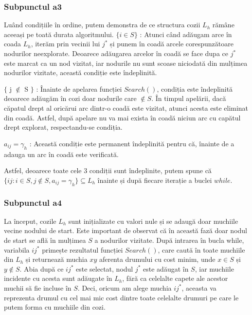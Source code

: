 \documentclass{article}
\begin{document}
\subsubsection*{\fontsize{14}{20}\selectfont Subpunctul a3}
{\fontsize{14}{16}\selectfont
Luând condițiile în ordine, putem demonstra de ce structura cozii $L_h$ rămâne aceeași pe toată durata algoritmului.
$\lbrace i \in S \rbrace$ : Atunci când adăugam arce în coada $L_h$, iterăm prin vecinii lui $j^*$ și punem în coadă arcele corespunzătoare nodurilor neexplorate. Deoarece adăugarea arcelor în coadă se face dupa ce $j^*$ este marcat ca un nod vizitat, iar nodurile nu sunt scoase niciodată din mulțimea nodurilor vizitate, această condiție este îndeplinită.

$\lbrace$ j $\notin$ S $\rbrace$ : Înainte de apelarea funcției $Search()$, condiția este îndeplinită deoarece adăugăm în cozi doar nodurile care $\notin S$. În timpul apelării, dacă căpatul drept al oricărui arc dintr-o coadă este vizitat, atunci acesta este eliminat din coadă. Astfel, după apelare nu va mai exista în coadă niciun arc cu capătul drept explorat, respectandu-se condiția.

$a_{ij} = \gamma_h$ : Această condiție este permanent îndeplinită pentru că, înainte de a adauga un arc în coadă este verificată.

Astfel, deoarece toate cele 3 condiții sunt îndeplinite, putem spune că $\lbrace ij : i \in S, j \notin S, a_{ij} = \gamma_h \rbrace \subseteq L_h$ înainte și după fiecare iterație a buclei $while$.

}

\subsubsection*{\fontsize{14}{20}\selectfont Subpunctul a4}
{\fontsize{14}{16}\selectfont

La început, cozile $L_h$ sunt inițializate cu valori nule și se adaugă doar muchiile vecine nodului de start. Este important de observat că în această fază doar nodul de start se află în mulțimea $S$ a nodurilor vizitate. După intrarea în bucla while, variabila $ij^*$ primește rezultatul funcției $Search()$, care caută în toate muchiile din $L_h$ și returnează muchia $xy$ aferenta drumului cu cost minim, unde $x \in S$ și $y \notin S$. Abia după ce $ij^*$ este selectat, nodul $j^*$ este adăugat în $S$, iar muchiile incidente cu acesta sunt adăugate în $L_h$, fără ca celelalte capete ale acestor muchii să fie incluse în $S$. Deci, oricum am alege muchia $ij^*$, aceasta va reprezenta drumul cu cel mai mic cost dintre toate celelalte drumuri pe care le putem forma cu muchiile din cozi.

}
\end{document}
